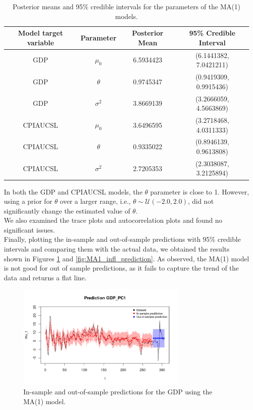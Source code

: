 \begin{table}[H]
    \centering
    \begin{tabular}{|c|c|c|c|}
        \hline
        \textbf{Model target variable } & \textbf{Parameter } & \textbf{Posterior Mean } & \textbf{95\% Credible Interval } \\
        \hline
        GDP      & $\mu_0$    & 6.5934423 & (6.1441382, 7.0421211) \\
        GDP      & $\theta$   & 0.9745347 & (0.9419309, 0.9915436) \\
        GDP      & $\sigma^2$ & 3.8669139 & (3.2666059, 4.5663869) \\
        CPIAUCSL & $\mu_0$    & 3.6496595 & (3.2718468, 4.0311333) \\
        CPIAUCSL & $\theta$   & 0.9335022 & (0.8946139, 0.9613808) \\
        CPIAUCSL & $\sigma^2$ & 2.7205353 & (2.3038087, 3.2125894) \\
        \hline
    \end{tabular}
    \caption{Posterior means and 95\% credible intervals for the parameters of the MA(1) models.}
    \label{tab:MA1_posteriors}
\end{table}
In both the GDP and CPIAUCSL models, the $\theta$ parameter is close to 1. However, using a prior for $\theta$ over a larger range, i.e., $\theta \sim \mathcal{U}(-2.0, 2.0)$, did not significantly change the estimated value of $\theta$. \\
We also examined the trace plots and autocorrelation plots and found no significant issues. \\
Finally, plotting the in-sample and out-of-sample predictions with 95\% credible intervals and comparing them with the actual data, we obtained the results shown in Figures \ref{fig:MA1_gdp_prediction} and \ref{fig:MA1_infl_prediction}. As observed, the MA(1) model is not good for out of sample predictions, as it fails to capture the trend of the data and returns a flat line.
\begin{figure}[H]
    \centering
    \includegraphics[width=0.75\textwidth]{images/3-MA/gdp_prediction.png}
    \caption{In-sample and out-of-sample predictions for the GDP using the MA(1) model.}
    \label{fig:MA1_gdp_prediction}
\end{figure}
